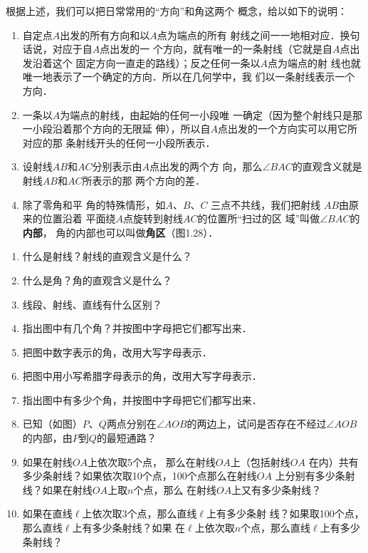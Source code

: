 根据上述，我们可以把日常常用的“方向”和角这两个
概念，给以如下的说明：
\begin{enumerate}
\item 自定点$A$出发的所有方向和以$A$点为端点的所有
射线之间一一地相对应．换句话说，对应于自$A$点出发的一
个方向，就有唯一的一条射线（它就是自$A$点出发沿着这个
固定方向一直走的路线）；反之任何一条以$A$点为端点的射
线也就唯一地表示了一个确定的方向．所以在几何学中，我
们以一条射线表示一个方向．
\item 一条以$A$为端点的射线，由起始的任何一小段唯
一确定（因为整个射线只是那一小段沿着那个方向的无限延
伸），所以自$A$点出发的一个方向实可以用它所对应的那
条射线开头的任何一小段所表示．
\item 设射线$AB$和$AC$分别表示由$A$点出发的两个方
向，那么$\angle BAC$的直观含义就是射线$AB$和$AC$所表示的那
两个方向的差．
\item 除了零角和平
角的特殊情形，如$A$、$B$、$C$
三点不共线，我们把射线
$AB$由原来的位置沿着
平面绕$A$点旋转到射线$AC$的位置所“扫过的区
域”叫做$\angle BAC$的\textbf{内部}，
角的内部也可以叫做\textbf{角区}（图1.28）．
\end{enumerate}

\begin{ex}
\begin{enumerate}
	\item 什么是射线？射线的直观含义是什么？
	\item 什么是角？角的直观含义是什么？
	\item 线段、射线、直线有什么区别？
	\item 指出图中有几个角？并按图中字母把它们都写出来．
	\item 把图中数字表示的角，改用大写字母表示．
	\item 把图中用小写希腊字母表示的角，改用大写字母表示．
	\item 指出图中有多少个角，并按图中字母把它们都写出来．
	\item 已知（如图）$P$、$Q$两点分别在$\angle AOB$的两边上，试问是否存在不经过$\angle AOB$的内部，由$	P$到$Q$的最短通路？
	\item 如果在射线$OA$上依次取5个点，
	那么在射线$OA$上（包括射线$OA$
	在内）共有多少条射线？如果依次取10个点，100个点那么在射线$OA$
	上分别有多少条射线？如果在射线$OA$上取$n$个点，那么
在射线$OA$上又有多少条射线？
\item 如果在直线$\ell$上依次取3个点，那么直线$\ell$上有多少条射
线？如果取100个点，那么直线$\ell$上有多少条射线？如果
在$\ell$上依次取$n$个点，那么直线$\ell$上有多少条射线？
\end{enumerate}
\end{ex}

